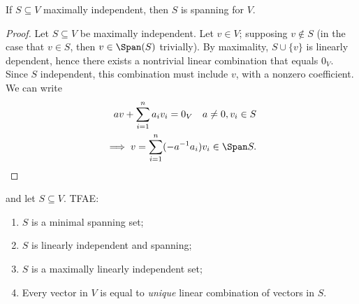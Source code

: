 \begin{lemma}
    If $S \subseteq V$ maximally independent, then $S$ is spanning for $V$.
\end{lemma}

\begin{proof}
    Let $S \subseteq V$ be maximally independent. Let $v \in V$; supposing $v \notin S$ (in the case that $v \in S$, then $v \in \Span (S)$ trivially). By maximality, $S \cup \{v\}$ is linearly dependent, hence there exists a nontrivial linear combination that equals $0_V$. Since $S$ independent, this combination must include $v$, with a nonzero coefficient. We can write \begin{align*}
        a v + \sum_{i=1}^{n} a_i v_i = 0_V \quad a \neq 0, v_i \in S\\
        \implies v = \sum_{i=1}^{n} (-a^{-1}a_i)v_i \in \Span S.
    \end{align*}
\end{proof}

\begin{theorem}
     and let $S \subseteq V$. TFAE: \begin{enumerate}
        \item $S$ is a minimal spanning set;
        \item $S$ is linearly independent and spanning;
        \item $S$ is a maximally linearly independent set;
        \item Every vector in $V$ is equal to \emph{unique} linear combination of vectors in $S$.
    \end{enumerate}
\end{theorem}